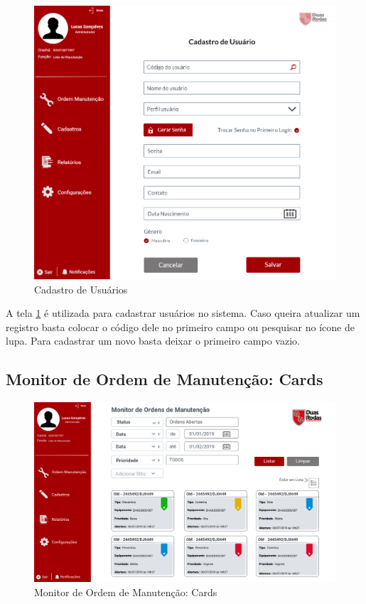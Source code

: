 \begin{figure}[H]
	\caption{\label{web_cad-user}Cadastro de Usuários}
	\begin{center}
		\includegraphics[scale=0.70]{./Figuras/web/cad-user.png}
	\end{center}
\end{figure}

A tela \ref{web_cad-user} é utilizada para cadastrar usuários no sistema. Caso queira atualizar um registro basta colocar o código dele no primeiro campo ou pesquisar no ícone de lupa. Para cadastrar um novo basta deixar o primeiro campo vazio.

\subsection{Monitor de Ordem de Manutenção: Cards}

\begin{figure}[H]
	\caption{\label{web_monitor-om-card}Monitor de Ordem de Manutenção: Cards}
	\begin{center}
		\includegraphics[scale=0.45]{./Figuras/web/monitor-om-card.png}
	\end{center}
\end{figure}

